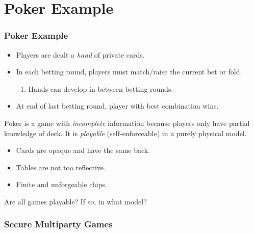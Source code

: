 \documentclass[10pt]{beamer}
\begin{document}
\section{Poker Example}
\begin{frame}
\frametitle{Poker Example}

\begin{itemize}
\item Players are dealt a \textit{hand} of private cards.
\item In each betting round, players must match/raise the current bet or fold.
\begin{enumerate}
\item Hands can develop in between betting rounds.
\end{enumerate}
\item At end of last betting round, player with best combination wins.
\end{itemize}

Poker is a game with \textit{incomplete} information because players only
have partial knowledge of deck.
It is \textit{playable} (self-enforceable) in a purely physical model.

\begin{itemize}
\item Cards are opaque and have the same back.
\item Tables are not too reflective.
\item Finite and unforgeable chips.
\end{itemize}

Are all games playable? If so, in what model?

\end{frame}

\frametitle{Secure Multiparty Games}
\end{document}
